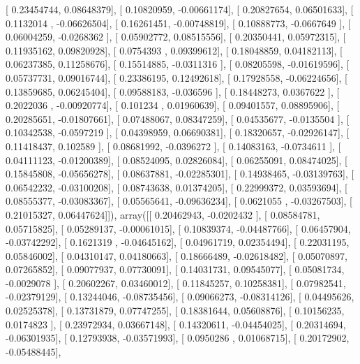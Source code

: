 \documentclass{article}
\begin{document}
       [ 0.23454744,  0.08648379],
       [ 0.10820959, -0.00661174],
       [ 0.20827654,  0.06501633],
       [ 0.1132014 , -0.06626504],
       [ 0.16261451, -0.00748819],
       [ 0.10888773, -0.0667649 ],
       [ 0.06004259, -0.0268362 ],
       [ 0.05902772,  0.08515556],
       [ 0.20350441,  0.05972315],
       [ 0.11935162,  0.09820928],
       [ 0.0754393 ,  0.09399612],
       [ 0.18048859,  0.04182113],
       [ 0.06237385,  0.11258676],
       [ 0.15514885, -0.0311316 ],
       [ 0.08205598, -0.01619596],
       [ 0.05737731,  0.09016744],
       [ 0.23386195,  0.12492618],
       [ 0.17928558, -0.06224656],
       [ 0.13859685,  0.06245404],
       [ 0.09588183, -0.036596  ],
       [ 0.18448273,  0.0367622 ],
       [ 0.2022036 , -0.00920774],
       [ 0.101234  ,  0.01960639],
       [ 0.09401557,  0.08895906],
       [ 0.20285651, -0.01807661],
       [ 0.07488067,  0.08347259],
       [ 0.04535677, -0.0135504 ],
       [ 0.10342538, -0.0597219 ],
       [ 0.04398959,  0.06690381],
       [ 0.18320657, -0.02926147],
       [ 0.11418437,  0.102589  ],
       [ 0.08681992, -0.0396272 ],
       [ 0.14083163, -0.0734611 ],
       [ 0.04111123, -0.01200389],
       [ 0.08524095,  0.02826084],
       [ 0.06255091,  0.08474025],
       [ 0.15845808, -0.05656278],
       [ 0.08637881, -0.02285301],
       [ 0.14938465, -0.03139763],
       [ 0.06542232, -0.03100208],
       [ 0.08743638,  0.01374205],
       [ 0.22999372,  0.03593694],
       [ 0.08555377, -0.03083367],
       [ 0.05565641, -0.09636234],
       [ 0.0621055 , -0.03267503],
       [ 0.21015327,  0.06447624]]), array([[ 0.20462943, -0.0202432 ],
       [ 0.08584781,  0.05715825],
       [ 0.05289137, -0.00061015],
       [ 0.10839374, -0.04487766],
       [ 0.06457904, -0.03742292],
       [ 0.1621319 , -0.04645162],
       [ 0.04961719,  0.02354494],
       [ 0.22031195,  0.05846002],
       [ 0.04310147,  0.04180663],
       [ 0.18666489, -0.02618482],
       [ 0.05070897,  0.07265852],
       [ 0.09077937,  0.07730091],
       [ 0.14031731,  0.09545077],
       [ 0.05081734, -0.0029078 ],
       [ 0.20602267,  0.03460012],
       [ 0.11845257,  0.10258381],
       [ 0.07982541, -0.02379129],
       [ 0.13244046, -0.08735456],
       [ 0.09066273, -0.08314126],
       [ 0.04495626,  0.02525378],
       [ 0.13731879,  0.07747255],
       [ 0.18381644,  0.05608876],
       [ 0.10156235,  0.0174823 ],
       [ 0.23972934,  0.03667148],
       [ 0.14320611, -0.04454025],
       [ 0.20314694, -0.06301935],
       [ 0.12793938, -0.03571993],
       [ 0.0950286 ,  0.01068715],
       [ 0.20172902, -0.05488445],
\end{document}
